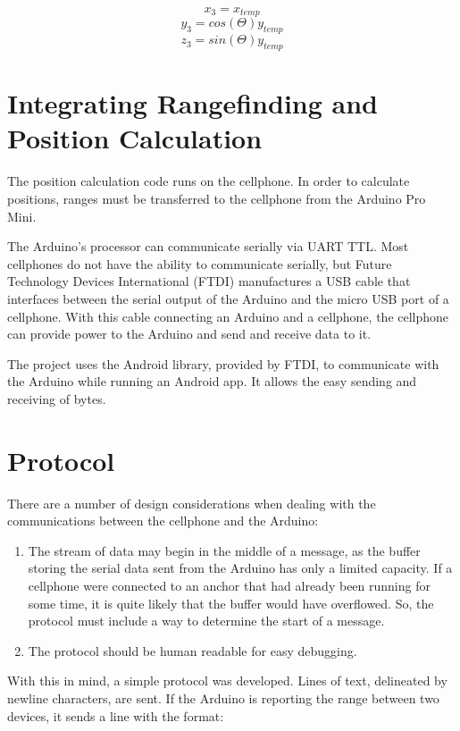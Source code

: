 \[ x_{3} = x_{temp} \]
\[ y_{3} = cos(\Theta) y_{temp} \]
\[ z_{3} = sin(\Theta) y_{temp} \]

\section{Integrating Rangefinding and Position Calculation}
The position calculation code runs on the cellphone. In order to calculate positions, ranges must be transferred to the cellphone from the Arduino Pro Mini. 

The Arduino's processor can communicate serially via UART TTL. Most cellphones do not have the ability to communicate serially, but Future Technology Devices International (FTDI) manufactures a USB cable that interfaces between the serial output of the Arduino and the micro USB port of a cellphone. With this cable connecting an Arduino and a cellphone, the cellphone can provide power to the Arduino and send and receive data to it.

The project uses the Android  library, provided by FTDI, to communicate with the Arduino while running an Android app. It allows the easy sending and receiving of bytes. 

\section{Protocol}
There are a number of design considerations when dealing with the communications between the cellphone and the Arduino:
\begin{enumerate}
	\item The stream of data may begin in the middle of a message, as the buffer storing the serial data sent from the Arduino has only a limited capacity. If a cellphone were connected to an anchor that had already been running for some time, it is quite likely that the buffer would have overflowed. So, the protocol must include a way to determine the start of a message.
	\item The protocol should be human readable for easy debugging.
\end{enumerate}

With this in mind, a simple protocol was developed. Lines of text, delineated by newline characters, are sent. If the Arduino is reporting the range between two devices, it sends a line with the format:

\begin{center}
\end{center}

